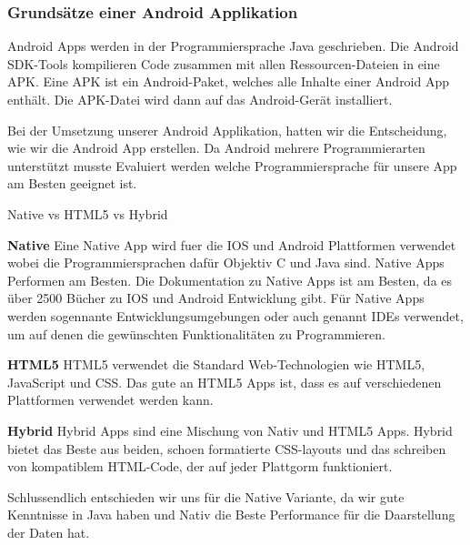\subsubsection{Grundsätze einer Android Applikation}
\label{subsec:aapp-fundam}

Android Apps werden in der Programmiersprache Java geschrieben.
Die Android SDK-Tools kompilieren Code zusammen mit allen Ressourcen-Dateien in eine APK.
Eine APK ist ein Android-Paket, welches alle Inhalte einer Android App enthält. 
Die APK-Datei wird dann auf das Android-Gerät installiert. 
\newline

Bei der Umsetzung unserer Android Applikation, hatten wir die Entscheidung, wie wir die Android App erstellen. 
Da Android mehrere Programmierarten unterstützt musste Evaluiert werden welche Programmiersprache für unsere App am Besten geeignet ist. \newline

{\Large Native vs HTML5 vs Hybrid}\newline

\textbf{Native} 
\newline
Eine Native App wird fuer die IOS und Android Plattformen verwendet wobei die Programmiersprachen dafür Objektiv C und Java sind.
Native Apps Performen am Besten.
Die Dokumentation zu Native Apps ist am Besten, da es über 2500 Bücher zu IOS und Android Entwicklung gibt.
Für Native Apps werden sogennante Entwicklungsumgebungen oder auch genannt IDEs verwendet, um auf denen die gewünschten Funktionalitäten zu Programmieren. 

\newline
\textbf{HTML5} 
\newline
HTML5 verwendet die Standard Web-Technologien wie HTML5, JavaScript und CSS. Das gute an HTML5 Apps ist, dass es auf verschiedenen Plattformen verwendet werden kann. 
\newline

\textbf{Hybrid} 
\newline
Hybrid Apps sind eine Mischung von Nativ und HTML5 Apps. Hybrid bietet das Beste aus beiden, schoen formatierte CSS-layouts und das schreiben von kompatiblem HTML-Code, der auf jeder Plattgorm funktioniert. 

\newline
\newline

Schlussendlich entschieden wir uns für die Native Variante, da wir gute Kenntnisse in Java haben und Nativ die Beste Performance für die Daarstellung der Daten hat.


\cite{FAIF.CH2-android-dev.NativeWeborHybrid}
\clearpage %
